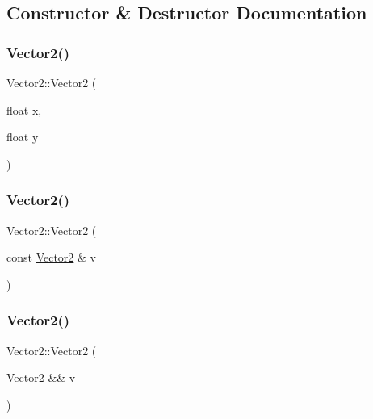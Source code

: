 \subsection{Constructor \& Destructor Documentation}
\mbox{\label{class_vector2_a061ab58a0e216c759d64e3746d712b12}} 
\subsubsection{\texorpdfstring{Vector2()}{Vector2()}\hspace{0.1cm}{\footnotesize\ttfamily [1/3]}}
{\footnotesize\ttfamily Vector2\+::\+Vector2 (\begin{DoxyParamCaption}\item[{float}]{x,  }\item[{float}]{y }\end{DoxyParamCaption})\hspace{0.3cm}{\ttfamily [inline]}}

\mbox{\label{class_vector2_a299d9e1cd67d3fb587f57170afab9741}} 
\subsubsection{\texorpdfstring{Vector2()}{Vector2()}\hspace{0.1cm}{\footnotesize\ttfamily [2/3]}}
{\footnotesize\ttfamily Vector2\+::\+Vector2 (\begin{DoxyParamCaption}\item[{const \mbox{\hyperlink{class_vector2}{Vector2}} \&}]{v }\end{DoxyParamCaption})\hspace{0.3cm}{\ttfamily [inline]}}

\mbox{\label{class_vector2_a3b31e941af6b8fbdb151b5cfadcc23bc}} 
\subsubsection{\texorpdfstring{Vector2()}{Vector2()}\hspace{0.1cm}{\footnotesize\ttfamily [3/3]}}
{\footnotesize\ttfamily Vector2\+::\+Vector2 (\begin{DoxyParamCaption}\item[{\mbox{\hyperlink{class_vector2}{Vector2}} \&\&}]{v }\end{DoxyParamCaption})\hspace{0.3cm}{\ttfamily [inline]}}

